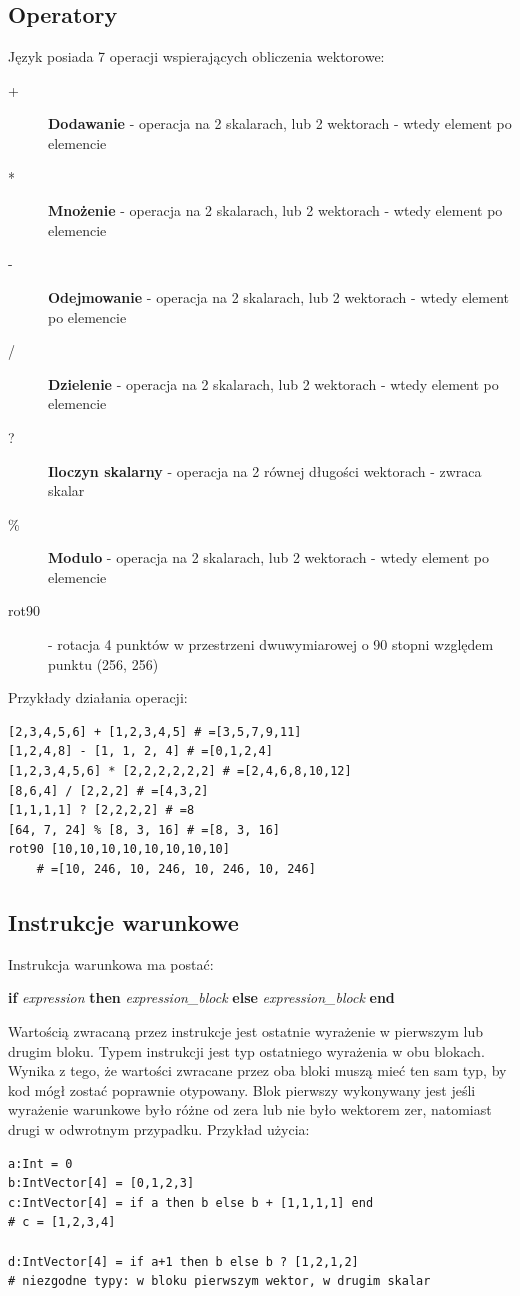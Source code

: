\subsection{Operatory}
Język posiada 7 operacji wspierających obliczenia wektorowe:
\begin{description}
  \item[+] \textbf{Dodawanie} - operacja na 2 skalarach, lub 2 wektorach - wtedy element po elemencie
  \item[*] \textbf{Mnożenie} - operacja na 2 skalarach, lub 2 wektorach - wtedy element po elemencie
  \item[-] \textbf{Odejmowanie} - operacja na 2 skalarach, lub 2 wektorach - wtedy element po elemencie
  \item[/] \textbf{Dzielenie} - operacja na 2 skalarach, lub 2 wektorach - wtedy element po elemencie
  \item[?] \textbf{Iloczyn skalarny} - operacja na 2 równej długości wektorach - zwraca skalar
  \item[\%] \textbf{Modulo} - operacja na 2 skalarach, lub 2 wektorach - wtedy element po elemencie
  \item[rot90] - rotacja 4 punktów w przestrzeni dwuwymiarowej o 90 stopni względem punktu (256, 256)
\end{description}

Przykłady działania operacji:
\begin{lstlisting}[frame=single]
[2,3,4,5,6] + [1,2,3,4,5] # =[3,5,7,9,11]
[1,2,4,8] - [1, 1, 2, 4] # =[0,1,2,4]
[1,2,3,4,5,6] * [2,2,2,2,2,2] # =[2,4,6,8,10,12]
[8,6,4] / [2,2,2] # =[4,3,2]
[1,1,1,1] ? [2,2,2,2] # =8
[64, 7, 24] % [8, 3, 16] # =[8, 3, 16]
rot90 [10,10,10,10,10,10,10,10] 
    # =[10, 246, 10, 246, 10, 246, 10, 246]
\end{lstlisting}

\subsection{Instrukcje warunkowe}
Instrukcja warunkowa ma postać:
\begin{center}
\textbf{if} \textit{expression} \textbf{then} \textit{expression\_block} \textbf{else} \textit{expression\_block} \textbf{end}
\end{center}
Wartością zwracaną przez instrukcje jest ostatnie wyrażenie w pierwszym lub drugim bloku. Typem instrukcji jest typ ostatniego wyrażenia w obu blokach. Wynika z tego, że wartości zwracane przez oba bloki muszą mieć ten sam typ, by kod mógł zostać poprawnie otypowany. Blok pierwszy wykonywany jest jeśli wyrażenie warunkowe było różne od zera lub nie było wektorem zer, natomiast drugi w odwrotnym przypadku.
Przykład użycia:
\begin{lstlisting}[frame=single]
a:Int = 0
b:IntVector[4] = [0,1,2,3]
c:IntVector[4] = if a then b else b + [1,1,1,1] end
# c = [1,2,3,4]

d:IntVector[4] = if a+1 then b else b ? [1,2,1,2]
# niezgodne typy: w bloku pierwszym wektor, w drugim skalar 
\end{lstlisting}

